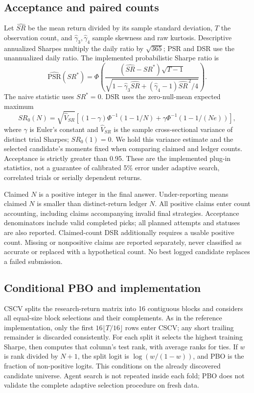 \documentclass[11pt]{article}
\begin{document}
\subsection{Acceptance and paired counts}
Let $\widehat{SR}$ be the mean return divided by its sample standard deviation,
$T$ the observation count, and $\widehat\gamma_3,\widehat\gamma_4$ sample
skewness and raw kurtosis. Descriptive annualized Sharpes multiply the daily
ratio by $\sqrt{365}$; PSR and DSR use the unannualized daily ratio.
The implemented probabilistic Sharpe ratio is
\begin{equation}
\widehat{\mathrm{PSR}}(SR^*)=\Phi\!\left(
\frac{(\widehat{SR}-SR^*)\sqrt{T-1}}
{\sqrt{1-\widehat\gamma_3\widehat{SR}+
(\widehat\gamma_4-1)\widehat{SR}^{\,2}/4}}\right).
\end{equation}
The naive statistic uses $SR^*=0$. DSR uses the zero-null-mean expected maximum
\begin{equation}
SR_0(N)=\sqrt{\widehat V_{SR}}\left[
(1-\gamma)\Phi^{-1}(1-1/N)+\gamma\Phi^{-1}(1-1/(Ne))\right],
\end{equation}
where $\gamma$ is Euler's constant and $\widehat V_{SR}$ is the sample
cross-sectional variance of distinct trial Sharpes; $SR_0(1)=0$. We hold this
variance estimate and the selected candidate's moments fixed when comparing
claimed and ledger counts. Acceptance is strictly greater than 0.95.
These are the implemented plug-in statistics, not a guarantee of calibrated
5\% error under adaptive search, correlated trials or serially dependent returns.

Claimed $N$ is a positive integer in the final answer. Under-reporting means
claimed $N$ is smaller than distinct-return ledger $N$. All positive claims enter
count accounting, including claims accompanying invalid final strategies.
Acceptance denominators include valid completed picks; all planned attempts and
statuses are also reported. Claimed-count DSR additionally requires a usable
positive count. Missing or nonpositive claims are reported separately, never
classified as accurate or replaced with a hypothetical count.
No best logged candidate replaces a failed submission.

\subsection{Conditional PBO and implementation}
CSCV splits the research-return matrix into 16 contiguous blocks and considers
all equal-size block selections and their complements. As in the reference
implementation, only the first $16\lfloor T/16\rfloor$ rows enter CSCV; any
short trailing remainder is discarded consistently. For each split it selects
the highest training Sharpe, then computes that column's test rank, with average
ranks for ties. If $w$ is rank divided by $N+1$, the split logit is
$\log(w/(1-w))$, and PBO is the fraction of non-positive logits.
This conditions on the already discovered candidate universe. Agent search is
not repeated inside each fold; PBO does not validate the complete adaptive
selection procedure on fresh data.
\end{document}
